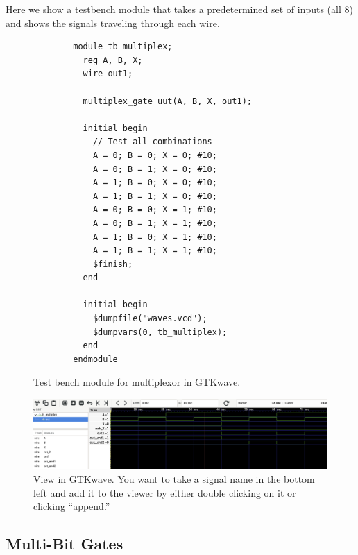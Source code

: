   \begin{example}
    Here we show a testbench module that takes a predetermined set of inputs (all 8) and shows the signals traveling through each wire. 

    \begin{figure}[H]
      \centering 
      \begin{lstlisting}
        module tb_multiplex;
          reg A, B, X;
          wire out1;

          multiplex_gate uut(A, B, X, out1);

          initial begin
            // Test all combinations
            A = 0; B = 0; X = 0; #10;
            A = 0; B = 1; X = 0; #10;
            A = 1; B = 0; X = 0; #10;
            A = 1; B = 1; X = 0; #10;
            A = 0; B = 0; X = 1; #10;
            A = 0; B = 1; X = 1; #10;
            A = 1; B = 0; X = 1; #10;
            A = 1; B = 1; X = 1; #10;
            $finish;
          end

          initial begin
            $dumpfile("waves.vcd");
            $dumpvars(0, tb_multiplex);
          end
        endmodule
      \end{lstlisting}
      \caption{Test bench module for multiplexor in GTKwave.} 
    \end{figure}

    \begin{figure}[H]
      \centering 
      \includegraphics[scale=0.3]{img/multiplexor_gtk.png}
      \caption{View in GTKwave. You want to take a signal name in the bottom left and add it to the viewer by either double clicking on it or clicking ``append.''}
    \end{figure}
  \end{example}

\subsection{Multi-Bit Gates}

  \begin{definition}
    
  \end{definition}


